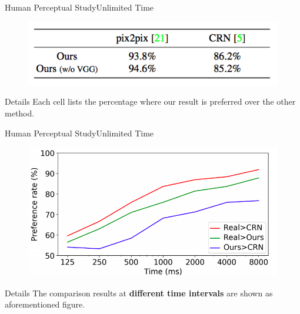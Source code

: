 \documentclass{beamer}
\begin{document}
\begin{frame}{Human Perceptual Study}{Unlimited Time}
\begin{figure}
	\centering
	\includegraphics[height=0.35\textheight]{images/unlimite_time}
\end{figure}
%
%
\begin{beamerboxesrounded}[upper=uppercol,lower=lowercol,shadow=false]{Details }
Each cell lists the percentage where our result is preferred over the other method.
\end{beamerboxesrounded}
\end{frame}

\begin{frame}{Human Perceptual Study}{Unlimited Time}
\begin{figure}
	\centering
	\includegraphics[height=0.45\textheight]{images/limite_time}
\end{figure}
%
%
\begin{beamerboxesrounded}[upper=uppercol,lower=lowercol,shadow=false]{Details }
The comparison results at \textbf{different time intervals} are shown as aforementioned figure.
\end{beamerboxesrounded}
\end{frame}
\end{document}

